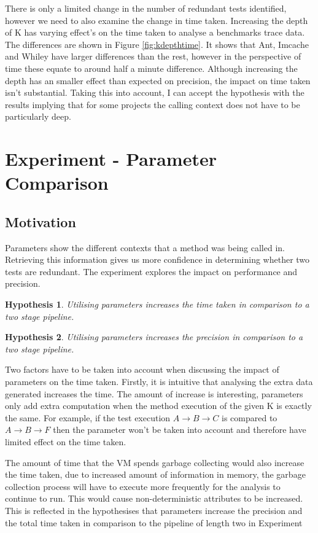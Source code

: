 \documentclass[11pt
              , a4paper
              , twoside
              , openright
              ]{report}
\newcommand{\rom}[1]{\uppercase\expandafter{\romannumeral #1\relax}}
\newtheorem{hyp}{Hypothesis}
\begin{document}
There is only a limited change in the number of redundant tests identified, however we need to also examine the change in time taken. Increasing the depth of K has varying effect's on the time taken to analyse a benchmarks trace data. The differences are shown in Figure \ref{fig:kdepthtime}. It shows that Ant, Imcache and Whiley have larger differences than the rest, however in the perspective of time these equate to around half a minute difference. Although increasing the depth has an smaller effect than expected on precision, the impact on time taken isn't substantial. Taking this into account, I can accept the hypothesis with the results implying that for some projects the calling context does not have to be particularly deep. 

\section{Experiment \rom{3} - Parameter Comparison}
\label{sec:param}

\subsection{Motivation}
Parameters show the different contexts that a method was being called in. Retrieving this information gives us more confidence in determining whether two tests are redundant. The experiment explores the impact on performance and precision.

\begin{hyp}
Utilising parameters increases the time taken in comparison to a two stage pipeline.
\end{hyp}

\begin{hyp}
Utilising parameters increases the precision in comparison to a two stage pipeline.
\end{hyp}

Two factors have to be taken into account when discussing the impact of parameters on the time taken. Firstly, it is intuitive that analysing the extra data generated increases the time. The amount of increase is interesting, parameters only add extra computation when the method execution of the given K is exactly the same. For example, if the test execution $A \rightarrow  B \rightarrow  C$ is compared to $A \rightarrow  B \rightarrow  F$ then the parameter won't be taken into account and therefore have limited effect on the time taken. 

The amount of time that the VM spends garbage collecting would also increase the time taken, due to increased amount of information in memory, the garbage collection process will have to execute more frequently for the analysis to continue to run. This would cause non-deterministic attributes to be increased. This is reflected in the hypothesises that parameters increase the precision and the total time taken in comparison to the pipeline of length two in Experiment \rom{1}
\end{document}
